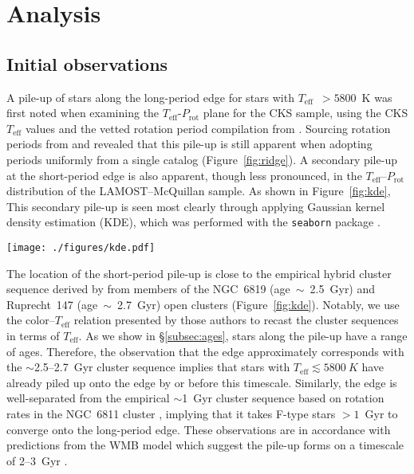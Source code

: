 \documentclass[linenumbers,tighten,trackchanges,twocolumn]{aastex631}
\newcommand{\lamostmcq}{LAMOST--McQuillan\xspace}
\newcommand{\teff}{\ensuremath{T_{\mathrm{eff}}}\xspace}
\newcommand{\prot}{\ensuremath{P_\mathrm{rot}}\xspace}
\begin{document}
\section{Analysis}
\label{sec:analysis}

\subsection{Initial observations}
A pile-up of stars along the long-period edge for stars with \teff~$>5800$~K was first noted when examining the \teff-\prot plane for the CKS sample, using the CKS \teff values and the vetted rotation period compilation from \citet{David2021}. Sourcing rotation periods from \citet{McQuillan2013, Mazeh2015} and \citet{Angus2018} revealed that this pile-up is still apparent when adopting periods uniformly from a single catalog (Figure~\ref{fig:ridge}). A secondary pile-up at the short-period edge is also apparent, though less pronounced, in the \teff--\prot distribution of the \lamostmcq sample. As shown in Figure~\ref{fig:kde}, This secondary pile-up is seen most clearly through applying Gaussian kernel density estimation (KDE), which was performed with the \texttt{seaborn} package \citep{seaborn}.

\begin{figure*}
    \centering
    \texttt{[image: ./figures/kde.pdf]}
    \caption{Gaussian kernel density estimation (blue contours) of the \teff--\prot distributions of the CKS--McQuillan, \lamostmcq, and asteroseismic \citet{Hall2021} samples, from left to right. Empirical cluster sequences from \citet{Curtis2020} are shown by the dark grey lines. The orange dashed lines show constant Rossby curves of fiducial values (see \S\ref{subsec:rossby}). The short-period pile-up can be observed in the LAMOST--McQuillan sample for \teff~$\gtrsim$~5500~K. The orange point indicates the Sun's temperature and equatorial rotation period, with the errorbar capturing the range of periods measured from its differentially rotating surface.}
    \label{fig:kde}
\end{figure*}

The location of the short-period pile-up is close to the empirical hybrid cluster sequence derived by \citet{Curtis2020} from members of the NGC~6819 (age~$\sim$~2.5~Gyr) and Ruprecht~147 (age~$\sim$~2.7~Gyr) open clusters (Figure~\ref{fig:kde}). Notably, we use the color--\teff relation presented by those authors to recast the cluster sequences in terms of \teff. As we show in \S\ref{subsec:ages}, stars along the pile-up have a range of ages. Therefore, the observation that the edge approximately corresponds with the $\sim$2.5--2.7~Gyr cluster sequence implies that stars with \teff$\lesssim 5800~K$ have already piled up onto the edge by or before this timescale. Similarly, the edge is well-separated from the empirical $\sim$1~Gyr cluster sequence based on rotation rates in the NGC~6811 cluster \citep{Curtis2020}, implying that it takes F-type stars $>1$~Gyr to converge onto the long-period edge. These observations are in accordance with predictions from the WMB model which suggest the pile-up forms on a timescale of 2--3~Gyr \citep{vanSaders2019}.
\end{document}
